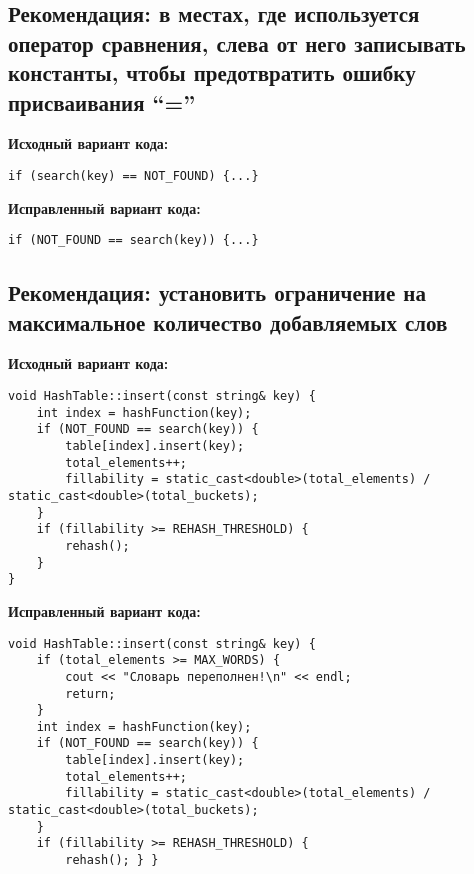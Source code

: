 \documentclass[11pt,a4paper,final]{article} %
\begin{document}
\subsection{Рекомендация: в местах, где используется оператор сравнения, слева от него записывать константы, чтобы предотвратить ошибку присваивания ``=''}

\begin{minipage}[t]{0.48\textwidth}
\textbf{Исходный вариант кода:}
\begin{lstlisting}
if (search(key) == NOT_FOUND) {...}
\end{lstlisting}
\end{minipage}
\hfill %
\begin{minipage}[t]{0.48\textwidth}
\textbf{Исправленный вариант кода:}
\begin{lstlisting}
if (NOT_FOUND == search(key)) {...}
\end{lstlisting}
\end{minipage}


\subsection{Рекомендация: установить ограничение на максимальное количество добавляемых слов}

\begin{minipage}[t]{0.48\textwidth}
\textbf{Исходный вариант кода:}
\begin{lstlisting}
void HashTable::insert(const string& key) {
	int index = hashFunction(key);
	if (NOT_FOUND == search(key)) {
		table[index].insert(key);
		total_elements++;
		fillability = static_cast<double>(total_elements) / static_cast<double>(total_buckets);
	}
	if (fillability >= REHASH_THRESHOLD) {
		rehash();
	}
}
\end{lstlisting}
\end{minipage}
\hfill %
\begin{minipage}[t]{0.48\textwidth}
\textbf{Исправленный вариант кода:}
\begin{lstlisting}
void HashTable::insert(const string& key) {
	if (total_elements >= MAX_WORDS) {
		cout << "Словарь переполнен!\n" << endl;
		return;
	}
	int index = hashFunction(key);
	if (NOT_FOUND == search(key)) {		
		table[index].insert(key);
		total_elements++;
		fillability = static_cast<double>(total_elements) / static_cast<double>(total_buckets);
	}
	if (fillability >= REHASH_THRESHOLD) {
		rehash(); } }
\end{lstlisting}
\end{minipage}
\end{document}
